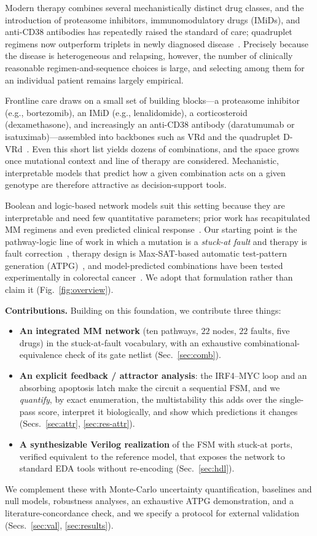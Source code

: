 \documentclass[conference,letterpaper]{IEEEtran}
\begin{document}
Modern therapy combines several mechanistically distinct drug classes, and the
introduction of proteasome inhibitors, immunomodulatory drugs (IMiDs), and
anti-CD38 antibodies has repeatedly raised the standard of care; quadruplet
regimens now outperform triplets in newly diagnosed disease~\cite{perseus}.
Precisely because the disease is heterogeneous and relapsing, however, the
number of clinically reasonable regimen-and-sequence choices is large, and
selecting among them for an individual patient remains largely empirical.

Frontline care draws on a small set of building blocks---a proteasome inhibitor
(e.g., bortezomib), an IMiD (e.g., lenalidomide), a corticosteroid
(dexamethasone), and increasingly an anti-CD38 antibody (daratumumab or
isatuximab)---assembled into backbones such as VRd and the quadruplet
D-VRd~\cite{perseus}. Even this short list yields dozens of combinations, and
the space grows once mutational context and line of therapy are considered.
Mechanistic, interpretable models that predict how a given combination acts on a
given genotype are therefore attractive as decision-support tools.

Boolean and logic-based network models suit this setting because they are
interpretable and need few quantitative parameters; prior work has recapitulated
MM regimens and even predicted clinical response~\cite{cbm,fumia}. Our starting point is the pathway-logic line of work
in which a mutation is a \emph{stuck-at fault} and therapy is fault
correction~\cite{layek,gsp}, therapy design is Max-SAT-based automatic
test-pattern generation (ATPG)~\cite{linkhatri}, and model-predicted combinations
have been tested experimentally in colorectal cancer~\cite{vundavilli}. We adopt
that formulation rather than claim it (Fig.~\ref{fig:overview}).

\noindent\textbf{Contributions.} Building on this foundation, we contribute three
things:
\begin{itemize}\itemsep2pt
  \item \textbf{An integrated MM network} (ten pathways, $22$ nodes, $22$ faults,
  five drugs) in the stuck-at-fault vocabulary, with an exhaustive
  combinational-equivalence check of its gate netlist (Sec.~\ref{sec:comb}).
  \item \textbf{An explicit feedback / attractor analysis}: the IRF4--MYC loop and
  an absorbing apoptosis latch make the circuit a sequential FSM, and we
  \emph{quantify}, by exact enumeration, the multistability this adds over the
  single-pass score, interpret it biologically, and show which predictions it
  changes (Secs.~\ref{sec:attr}, \ref{sec:res-attr}).
  \item \textbf{A synthesizable Verilog realization} of the FSM with stuck-at
  ports, verified equivalent to the reference model, that exposes the network to
  standard EDA tools without re-encoding (Sec.~\ref{sec:hdl}).
\end{itemize}
We complement these with Monte-Carlo uncertainty quantification, baselines and
null models, robustness analyses, an exhaustive ATPG demonstration, and a
literature-concordance check, and we specify a protocol for external validation
(Secs.~\ref{sec:val}, \ref{sec:results}).
\end{document}
